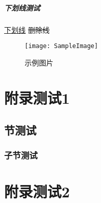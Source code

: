 \documentclass{../../PublicResources/DocClass}
\begin{document}
    \paragraph{下划线测试}
    \uline{下划线}
    \sout{删除线}

    \newpage
    \begin{figure}[h!]
        \centering
        \texttt{[image: SampleImage]}
        \caption{示例图片}
    \end{figure}

    \nocite{*} %
    \printbibliography %

    \appendix
    \chapter{附录测试1}
    \section{节测试}
    \subsection{子节测试}
    \chapter{附录测试2}
\end{document}
